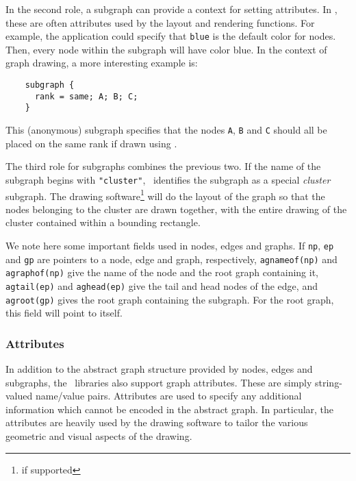 In the second role, a subgraph can provide a context for setting 
attributes. In \gviz, these are often attributes used by the layout
and rendering functions.
For example, the application could specify that {\tt blue}
is the default color for nodes. Then, every node within the subgraph will
have color blue. In the context of graph drawing, a more interesting
example is:
\begin{verbatim}
    subgraph {
      rank = same; A; B; C;
    }
\end{verbatim}
This (anonymous) subgraph specifies that the nodes {\tt A}, {\tt B} and {\tt C} 
should all be placed on the same rank if drawn using \dot.

The third role for subgraphs combines the previous two. If the name of
the subgraph begins with {\tt "cluster"}, \gviz\ identifies the subgraph
as a special {\em cluster} subgraph. The drawing software\footnote{if
supported} will do the layout of the graph so that the nodes belonging
to the cluster are drawn together, with the entire drawing of the cluster
contained within a bounding rectangle.

We note here some important fields used in nodes, edges and graphs.
If {\tt np}, {\tt ep} and {\tt gp} are pointers to a node, edge and
graph, respectively, {\tt agnameof(np)} and {\tt agraphof(np)} give the 
name of the node and the root graph containing it, 
{\tt agtail(ep)} and {\tt aghead(ep)} give the tail and head nodes of the
edge, and {\tt agroot(gp)} gives the root graph containing the subgraph.
For the root graph, this field will point to itself. 

\subsubsection{Attributes}
\label{sec:attributes}
In addition to the abstract graph structure provided by nodes, edges and
subgraphs, the \gviz\ libraries also support graph attributes. These
are simply string-valued name/value pairs. Attributes are used to specify
any additional information which cannot be encoded in the abstract graph.
In particular, the attributes are heavily used by the drawing software to
tailor the various geometric and visual aspects of the drawing.


